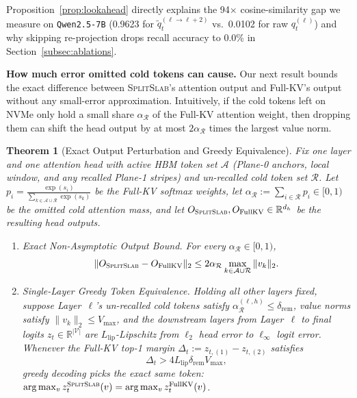 \documentclass[pdflatex,sn-mathphys-num]{sn-jnl}
\theoremstyle{thmstyleone}
\newtheorem{theorem}{Theorem}
\newcommand{\SplitSlab}{\textsc{SplitSlab}}
\begin{document}
Proposition~\ref{prop:lookahead} directly explains the 94$\times$ cosine-similarity gap we measure on \texttt{Qwen2.5-7B} (0.9623 for $\tilde{q}_t^{(\ell\to\ell+2)}$ vs.\ 0.0102 for raw $q_t^{(\ell)}$) and why skipping re-projection drops recall accuracy to 0.0\% in Section~\ref{subsec:ablations}.

\textbf{How much error omitted cold tokens can cause.} Our next result bounds the exact difference between \SplitSlab{}'s attention output and Full-KV's output without any small-error approximation. Intuitively, if the cold tokens left on NVMe only hold a small share $\alpha_{\mathcal{R}}$ of the Full-KV attention weight, then dropping them can shift the head output by at most $2 \alpha_{\mathcal{R}}$ times the largest value norm.

\begin{theorem}[Exact Output Perturbation and Greedy Equivalence]\label{thm:perturbation}
Fix one layer and one attention head with active HBM token set $\mathcal{A}$ (Plane-0 anchors, local window, and any recalled Plane-1 stripes) and un-recalled cold token set $\mathcal{R}$. Let $p_i = \frac{\exp(s_i)}{\sum_{k \in \mathcal{A}\cup\mathcal{R}}\exp(s_k)}$ be the Full-KV softmax weights, let $\alpha_{\mathcal{R}} := \sum_{i \in \mathcal{R}} p_i \in [0, 1)$ be the omitted cold attention mass, and let $O_{\SplitSlab}, O_{\mathrm{FullKV}} \in \mathbb{R}^{d_h}$ be the resulting head outputs.
\begin{enumerate}
  \item \emph{Exact Non-Asymptotic Output Bound.} For every $\alpha_{\mathcal{R}} \in [0, 1)$,
  \begin{equation}\label{eq:thm1_bound}
  \|O_{\SplitSlab} - O_{\mathrm{FullKV}}\|_2 \le 2 \alpha_{\mathcal{R}} \max_{k \in \mathcal{A} \cup \mathcal{R}} \|v_k\|_2.
  \end{equation}
  \item \emph{Single-Layer Greedy Token Equivalence.} Holding all other layers fixed, suppose Layer~$\ell$'s un-recalled cold tokens satisfy $\alpha_{\mathcal{R}}^{(\ell,h)} \le \delta_{\mathrm{rem}}$, value norms satisfy $\|v_k\|_2 \le V_{\max}$, and the downstream layers from Layer~$\ell$ to final logits $z_t \in \mathbb{R}^{|\mathcal{V}|}$ are $L_{\mathrm{lip}}$-Lipschitz from $\ell_2$ head error to $\ell_\infty$ logit error. Whenever the Full-KV top-1 margin $\Delta_t := z_{t,(1)} - z_{t,(2)}$ satisfies
  \begin{equation}\label{eq:thm1_margin}
  \Delta_t > 4 L_{\mathrm{lip}} \delta_{\mathrm{rem}} V_{\max},
  \end{equation}
  greedy decoding picks the exact same token: $\arg\max_v z_t^{\SplitSlab}(v) = \arg\max_v z_t^{\mathrm{FullKV}}(v)$.
\end{enumerate}
\end{theorem}
\end{document}
